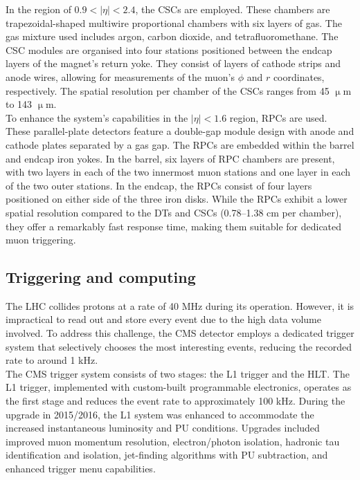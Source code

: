 In the region of $0.9 < |\eta| < 2.4$, the \ac{CSC}s are employed. 
These chambers are trapezoidal-shaped multiwire proportional chambers with six layers of gas. 
The gas mixture used includes argon, carbon dioxide, and tetrafluoromethane. 
The \ac{CSC} modules are organised into four stations positioned between the endcap layers of the magnet's return yoke. 
They consist of layers of cathode strips and anode wires, allowing for measurements of the muon's $\phi$ and $r$ coordinates, respectively. 
The spatial resolution per chamber of the \ac{CSC}s ranges from 45 $\upmu$m to 143 $\upmu$m. \\

To enhance the system's capabilities in the $|\eta| < 1.6$ region, \ac{RPC}s are used. 
These parallel-plate detectors feature a double-gap module design with anode and cathode plates separated by a gas gap. 
The \ac{RPC}s are embedded within the barrel and endcap iron yokes. 
In the barrel, six layers of \ac{RPC} chambers are present, with two layers in each of the two innermost muon stations and one layer in each of the two outer stations. 
In the endcap, the \ac{RPC}s consist of four layers positioned on either side of the three iron disks. 
While the \ac{RPC}s exhibit a lower spatial resolution compared to the \ac{DT}s and \ac{CSC}s (0.78–1.38 cm per chamber), they offer a remarkably fast response time, making them suitable for dedicated muon triggering.

\subsection{Triggering and computing}

The \ac{LHC} collides protons at a rate of 40 MHz during its operation. 
However, it is impractical to read out and store every event due to the high data volume involved. 
To address this challenge, the \ac{CMS} detector employs a dedicated trigger system that selectively chooses the most interesting events, reducing the recorded rate to around 1 kHz. \\

The \ac{CMS} trigger system consists of two stages: the \ac{L1} trigger and the \ac{HLT}. 
The \ac{L1} trigger, implemented with custom-built programmable electronics, operates as the first stage and reduces the event rate to approximately 100 kHz. 
During the upgrade in 2015/2016, the \ac{L1} system was enhanced to accommodate the increased instantaneous luminosity and \ac{PU} conditions. 
Upgrades included improved muon momentum resolution, electron/photon isolation, hadronic tau identification and isolation, jet-finding algorithms with \ac{PU} subtraction, and enhanced trigger menu capabilities. \\

